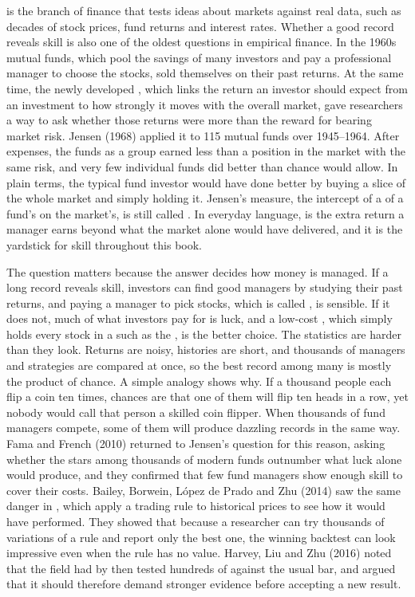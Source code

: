  is the branch of finance that tests ideas about markets against real data, such as decades of stock prices, fund returns and interest rates.
Whether a good record reveals skill is also one of the oldest questions in empirical finance. In the 1960s mutual funds, which pool the savings of many investors and pay a professional manager to choose the stocks, sold themselves on their past returns. At the same time, the newly developed , which links the return an investor should expect from an investment to how strongly it moves with the overall market, gave researchers a way to ask whether those returns were more than the reward for bearing market risk. Jensen (1968) applied it to 115 mutual funds over 1945--1964. After expenses, the funds as a group earned less than a  position in the market with the same risk, and very few individual funds did better than chance would allow. In plain terms, the typical fund investor would have done better by buying a slice of the whole market and simply holding it. Jensen's measure, the intercept of a  of a fund's  on the market's, is still called . In everyday language,  is the extra return a manager earns beyond what the market alone would have delivered, and it is the yardstick for skill throughout this book.

The question matters because the answer decides how money is managed. If a long record reveals skill, investors can find good managers by studying their past returns, and paying a manager to pick stocks, which is called , is sensible. If it does not, much of what investors pay for is luck, and a low-cost , which simply holds every stock in a  such as the , is the better choice. The statistics are harder than they look. Returns are noisy, histories are short, and thousands of managers and strategies are compared at once, so the best record among many is mostly the product of chance. A simple analogy shows why. If a thousand people each flip a coin ten times, chances are that one of them will flip ten heads in a row, yet nobody would call that person a skilled coin flipper. When thousands of fund managers compete, some of them will produce dazzling records in the same way. Fama and French (2010) returned to Jensen's question for this reason, asking whether the stars among thousands of modern funds outnumber what luck alone would produce, and they confirmed that few fund managers show enough skill to cover their costs. Bailey, Borwein, L\'opez de Prado and Zhu (2014) saw the same danger in , which apply a trading rule to historical prices to see how it would have performed. They showed that because a researcher can try thousands of variations of a rule and report only the best one, the winning backtest can look impressive even when the rule has no value. Harvey, Liu and Zhu (2016) noted that the field had by then tested hundreds of  against the usual bar, and argued that it should therefore demand stronger evidence before accepting a new result.

